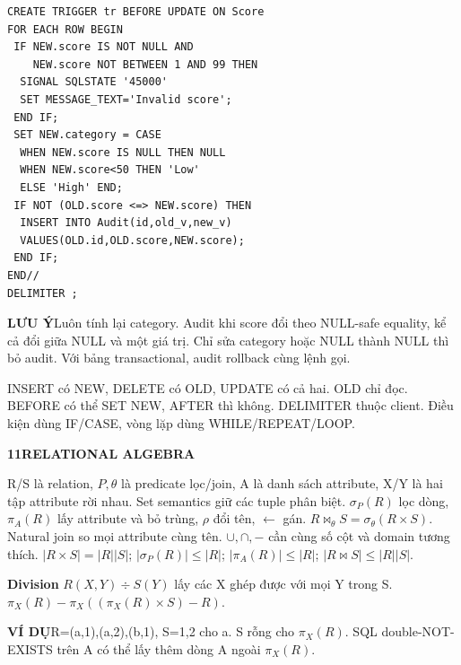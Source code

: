 \documentclass[a4paper]{article}
\newcommand{\bodyfontsize}{5.55}
\newcommand{\bodyleading}{5.2}
\newcommand{\bodylineskiplimit}{-2pt}
\newcommand{\bodystyle}{%
  \fontsize{\bodyfontsize}{\bodyleading}\selectfont\setlength{\lineskiplimit}{\bodylineskiplimit}\RaggedRight
  \setlength{\abovedisplayskip}{.5pt}\setlength{\belowdisplayskip}{.5pt}%
  \setlength{\abovedisplayshortskip}{.3pt}\setlength{\belowdisplayshortskip}{.3pt}}
\newcommand{\topic}[2]{\par\addvspace{.45pt}\nointerlineskip%
  \begingroup\setlength{\fboxsep}{0.35pt}%
  \noindent\colorbox{structure}{\parbox{\dimexpr\linewidth-2\fboxsep\relax}{%
    \color{white}\fontsize{6.45}{6.8}\selectfont\bfseries #1\enspace #2}}%
  \endgroup\par\nobreak\vspace{.55pt}\nointerlineskip\nobreak}
\newenvironment{topicblock}
  {\par\bodystyle}
  {\par}
\newcommand{\key}[1]{\par\textcolor{structure}{\textbf{#1}}\enspace}
\newcommand{\note}[4]{\par\nointerlineskip\vspace{.25pt}\begingroup\setlength{\fboxsep}{0.1pt}%
  \noindent\colorbox{#1}{\parbox{\dimexpr\linewidth-2\fboxsep\relax}{%
    \RaggedRight\textcolor{#2}{\textbf{#3}}\enspace #4}}%
  \endgroup\par\nointerlineskip\vspace{.25pt}}
\newcommand{\trap}[1]{\note{warningbg}{warning}{LƯU Ý}{#1}}
\newcommand{\ex}[1]{\note{examplebg}{example}{VÍ DỤ}{#1}}
\newlength{\sheetwidth}
\newenvironment{sheetcolumns}[1]
  {\noindent\begin{minipage}[t]{#1\sheetwidth}\vspace{0pt}\bodystyle\ignorespaces}
  {\end{minipage}\par}
\begin{document}
\begin{sheetcolumns}{.258}
\begin{topicblock}
\begin{lstlisting}
CREATE TRIGGER tr BEFORE UPDATE ON Score
FOR EACH ROW BEGIN
 IF NEW.score IS NOT NULL AND
    NEW.score NOT BETWEEN 1 AND 99 THEN
  SIGNAL SQLSTATE '45000'
  SET MESSAGE_TEXT='Invalid score';
 END IF;
 SET NEW.category = CASE
  WHEN NEW.score IS NULL THEN NULL
  WHEN NEW.score<50 THEN 'Low'
  ELSE 'High' END;
 IF NOT (OLD.score <=> NEW.score) THEN
  INSERT INTO Audit(id,old_v,new_v)
  VALUES(OLD.id,OLD.score,NEW.score);
 END IF;
END//
DELIMITER ;
\end{lstlisting}
\trap{Luôn tính lại category. Audit khi score đổi theo NULL-safe equality, kể cả đổi giữa NULL và một giá trị. Chỉ sửa category hoặc NULL thành NULL thì bỏ audit. Với bảng transactional, audit rollback cùng lệnh gọi.}
INSERT có NEW, DELETE có OLD, UPDATE có cả hai. OLD chỉ đọc. BEFORE có thể SET NEW, AFTER thì không. DELIMITER thuộc client. Điều kiện dùng IF/CASE, vòng lặp dùng WHILE/REPEAT/LOOP.
\end{topicblock}

\begin{topicblock}
\topic{11}{RELATIONAL ALGEBRA}
R/S là relation, $P,\theta$ là predicate lọc/join, A là danh sách attribute, X/Y là hai tập attribute rời nhau.
Set semantics giữ các tuple phân biệt. $\sigma_P(R)$ lọc dòng, $\pi_A(R)$ lấy attribute và bỏ trùng, $\rho$ đổi tên, $\leftarrow$ gán. $R\bowtie_\theta S=\sigma_\theta(R\times S)$. Natural join so mọi attribute cùng tên. $\cup,\cap,-$ cần cùng số cột và domain tương thích.
$|R\times S|=|R||S|$; $|\sigma_P(R)|\leq|R|$; $|\pi_A(R)|\leq|R|$; $|R\bowtie S|\leq|R||S|$.
\key{Division}
$R(X,Y)\div S(Y)$ lấy các X ghép được với mọi Y trong S.
$\pi_X(R)-\pi_X((\pi_X(R)\times S)-R)$.
\ex{R={(a,1),(a,2),(b,1)}, S={1,2} cho {a}. S rỗng cho $\pi_X(R)$. SQL double-NOT-EXISTS trên A có thể lấy thêm dòng A ngoài $\pi_X(R)$.}
\end{topicblock}


\end{sheetcolumns}
\end{document}
